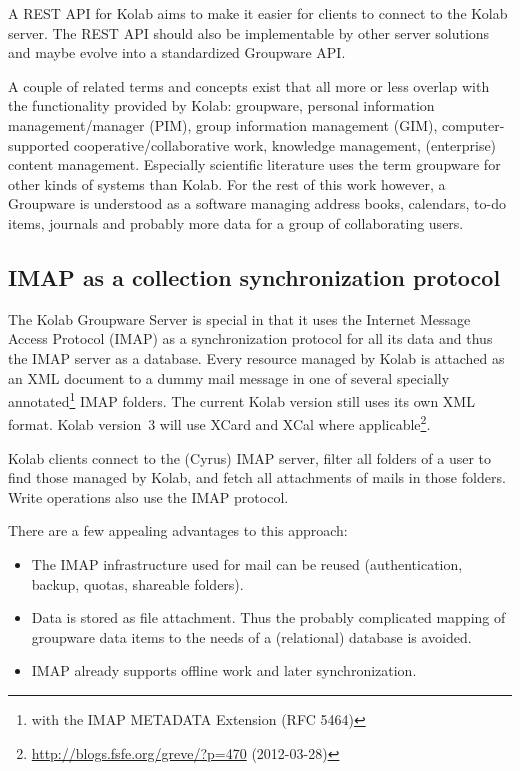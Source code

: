 \documentclass[11pt,a4paper,headsepline,twoside]{scrartcl}		%
\newcommand{\citeurl}[2]{\url{#1} (#2)}
\begin{document}
A REST API for Kolab aims to make it easier for clients to connect to the Kolab
server. The REST API should also be implementable by other server solutions and
maybe evolve into a standardized Groupware API.

A couple of related terms and concepts exist that all more or less overlap with
the functionality provided by Kolab: groupware, personal information
management/manager (PIM), group information management (GIM), computer-supported
cooperative/collaborative work, knowledge management, (enterprise) content
management. Especially scientific literature uses the term groupware for other
kinds of systems than Kolab\cite[sec. 2.1]{Stoermer2004}. For the rest of this
work however, a Groupware is understood as a software managing address books,
calendars, to-do items, journals and probably more data for a group of
collaborating users.

\subsection{IMAP as a collection synchronization protocol}
\label{sec:imap-as-collection}

The Kolab Groupware Server is special in that it uses the Internet Message
Access Protocol (IMAP) as a synchronization protocol for all its data and thus
the IMAP server as a database. Every resource managed by Kolab is attached as an
XML document to a dummy mail message in one of several specially
annotated\footnote{with the IMAP METADATA Extension (RFC 5464)} IMAP
folders. The current Kolab version still uses its own XML format. Kolab
version~3 will use XCard and XCal where
applicable\footnote{\citeurl{http://blogs.fsfe.org/greve/?p=470}{2012-03-28}}.

Kolab clients connect to the (Cyrus) IMAP server, filter all folders of a user
to find those managed by Kolab, and fetch all attachments of mails in those
folders. Write operations also use the IMAP protocol.

There are a few appealing advantages to this approach:

\begin{itemize}
\item The IMAP infrastructure used for mail can be reused (authentication,
  backup, quotas, shareable folders).
\item Data is stored as file attachment. Thus the probably complicated mapping
  of groupware data items to the needs of a (relational) database is avoided.
  \item IMAP already supports offline work and later synchronization.
\end{itemize}
\end{document}
